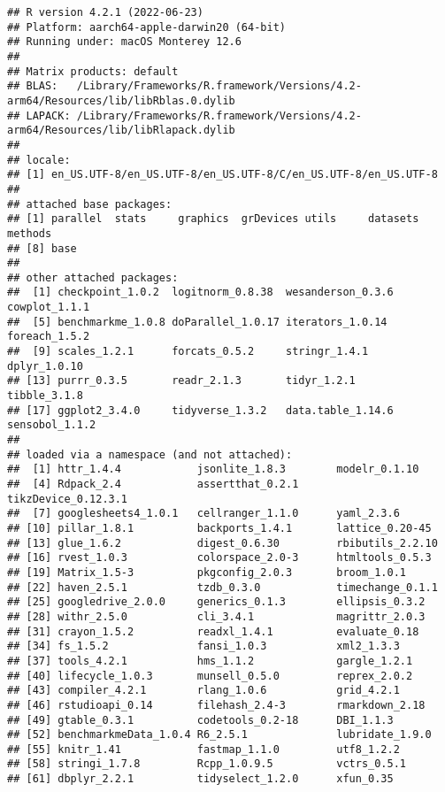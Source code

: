 \documentclass[
  11pt,
]{article}
\begin{document}
\begin{verbatim}
## R version 4.2.1 (2022-06-23)
## Platform: aarch64-apple-darwin20 (64-bit)
## Running under: macOS Monterey 12.6
## 
## Matrix products: default
## BLAS:   /Library/Frameworks/R.framework/Versions/4.2-arm64/Resources/lib/libRblas.0.dylib
## LAPACK: /Library/Frameworks/R.framework/Versions/4.2-arm64/Resources/lib/libRlapack.dylib
## 
## locale:
## [1] en_US.UTF-8/en_US.UTF-8/en_US.UTF-8/C/en_US.UTF-8/en_US.UTF-8
## 
## attached base packages:
## [1] parallel  stats     graphics  grDevices utils     datasets  methods  
## [8] base     
## 
## other attached packages:
##  [1] checkpoint_1.0.2  logitnorm_0.8.38  wesanderson_0.3.6 cowplot_1.1.1    
##  [5] benchmarkme_1.0.8 doParallel_1.0.17 iterators_1.0.14  foreach_1.5.2    
##  [9] scales_1.2.1      forcats_0.5.2     stringr_1.4.1     dplyr_1.0.10     
## [13] purrr_0.3.5       readr_2.1.3       tidyr_1.2.1       tibble_3.1.8     
## [17] ggplot2_3.4.0     tidyverse_1.3.2   data.table_1.14.6 sensobol_1.1.2   
## 
## loaded via a namespace (and not attached):
##  [1] httr_1.4.4            jsonlite_1.8.3        modelr_0.1.10        
##  [4] Rdpack_2.4            assertthat_0.2.1      tikzDevice_0.12.3.1  
##  [7] googlesheets4_1.0.1   cellranger_1.1.0      yaml_2.3.6           
## [10] pillar_1.8.1          backports_1.4.1       lattice_0.20-45      
## [13] glue_1.6.2            digest_0.6.30         rbibutils_2.2.10     
## [16] rvest_1.0.3           colorspace_2.0-3      htmltools_0.5.3      
## [19] Matrix_1.5-3          pkgconfig_2.0.3       broom_1.0.1          
## [22] haven_2.5.1           tzdb_0.3.0            timechange_0.1.1     
## [25] googledrive_2.0.0     generics_0.1.3        ellipsis_0.3.2       
## [28] withr_2.5.0           cli_3.4.1             magrittr_2.0.3       
## [31] crayon_1.5.2          readxl_1.4.1          evaluate_0.18        
## [34] fs_1.5.2              fansi_1.0.3           xml2_1.3.3           
## [37] tools_4.2.1           hms_1.1.2             gargle_1.2.1         
## [40] lifecycle_1.0.3       munsell_0.5.0         reprex_2.0.2         
## [43] compiler_4.2.1        rlang_1.0.6           grid_4.2.1           
## [46] rstudioapi_0.14       filehash_2.4-3        rmarkdown_2.18       
## [49] gtable_0.3.1          codetools_0.2-18      DBI_1.1.3            
## [52] benchmarkmeData_1.0.4 R6_2.5.1              lubridate_1.9.0      
## [55] knitr_1.41            fastmap_1.1.0         utf8_1.2.2           
## [58] stringi_1.7.8         Rcpp_1.0.9.5          vctrs_0.5.1          
## [61] dbplyr_2.2.1          tidyselect_1.2.0      xfun_0.35
\end{verbatim}
\end{document}
